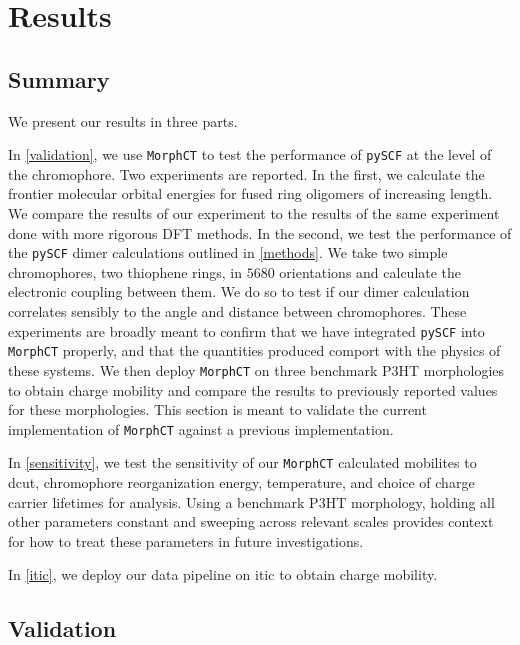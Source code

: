 \chapter{Results}
\label{results}

\section{Summary}

We present our results in three parts. 

In \autoref{validation}, we use \texttt{MorphCT} to test the performance of \texttt{pySCF} at the level of the chromophore.
Two experiments are reported. In the first, we calculate the frontier molecular orbital
energies for fused ring oligomers of increasing length. We compare the results of our experiment to the
results of the same experiment done with more rigorous DFT methods. In the second, we test the 
performance of the \texttt{pySCF} dimer calculations outlined in \autoref{methods}. 
We take two simple chromophores, two thiophene rings, in $5680$ orientations and calculate the
electronic coupling between them. We do so to test if our dimer calculation correlates sensibly to the angle
and distance between chromophores. These experiments are broadly meant to confirm that we have integrated
\texttt{pySCF} into \texttt{MorphCT} properly, and that the quantities produced comport with the physics of these systems.
We then deploy \texttt{MorphCT} on three benchmark P3HT morphologies to obtain charge mobility
and compare the results to previously reported values for these morphologies. This section is meant to
validate the current implementation of \texttt{MorphCT} against a previous implementation. 

In \autoref{sensitivity}, we test the sensitivity of our \texttt{MorphCT} calculated mobilites to dcut, chromophore
reorganization energy,  temperature, and choice of charge carrier lifetimes for  analysis. Using a
benchmark P3HT morphology, holding all other parameters constant and sweeping across relevant scales
provides context for how to treat these parameters in future investigations. 

In \autoref{itic}, we deploy our data pipeline on \gls{itic} to obtain charge mobility. 

\section{Validation}

